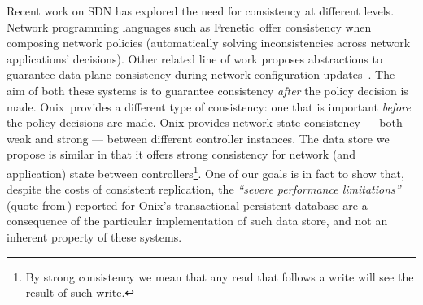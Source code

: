 

Recent work on SDN has explored the need for consistency at different levels. 
Network programming languages such as Frenetic\,\cite{Foster:2010wp} offer consistency when composing network policies (automatically solving inconsistencies across network applications' decisions). 
Other related line of work proposes abstractions to guarantee data-plane consistency during network configuration updates~\cite{reitblatt2012abstractions}. 
The aim of both these systems is to guarantee consistency \textit{after} the policy decision is made. 
Onix\,\cite{Koponen:2010th} provides a different type of consistency: one that is important \emph{before} the policy decisions are made. 
Onix provides network state consistency --- both weak and strong --- between different controller instances. 
The data store we propose is similar in that it offers strong consistency for network (and application) state between controllers\footnote{By strong consistency we mean that any read that follows a write will see the result of such write.}. 
One of our goals is in fact to show that, despite the costs of consistent replication, the \emph{``severe performance limitations''} (quote from\,\cite{Koponen:2010th}) reported for Onix's transactional persistent database are a consequence of the particular implementation of such data store, and not an inherent property of these systems. 


